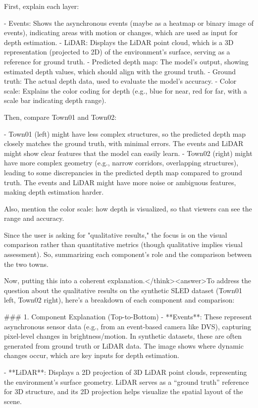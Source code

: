 First, explain each layer:

- Events: Shows the asynchronous events (maybe as a heatmap or binary image of events), indicating areas with motion or changes, which are used as input for depth estimation.
- LiDAR: Displays the LiDAR point cloud, which is a 3D representation (projected to 2D) of the environment's surface, serving as a reference for ground truth.
- Predicted depth map: The model's output, showing estimated depth values, which should align with the ground truth.
- Ground truth: The actual depth data, used to evaluate the model's accuracy.
- Color scale: Explains the color coding for depth (e.g., blue for near, red for far, with a scale bar indicating depth range).

Then, compare Town01 and Town02:

- Town01 (left) might have less complex structures, so the predicted depth map closely matches the ground truth, with minimal errors. The events and LiDAR might show clear features that the model can easily learn.
- Town02 (right) might have more complex geometry (e.g., narrow corridors, overlapping structures), leading to some discrepancies in the predicted depth map compared to ground truth. The events and LiDAR might have more noise or ambiguous features, making depth estimation harder.

Also, mention the color scale: how depth is visualized, so that viewers can see the range and accuracy.

Since the user is asking for "qualitative results," the focus is on the visual comparison rather than quantitative metrics (though qualitative implies visual assessment). So, summarizing each component's role and the comparison between the two towns.

Now, putting this into a coherent explanation.</think><answer>To address the question about the qualitative results on the synthetic SLED dataset (Town01 left, Town02 right), here’s a breakdown of each component and comparison:  


### 1. Component Explanation (Top-to-Bottom)  
- **Events**:  
  These represent asynchronous sensor data (e.g., from an event-based camera like DVS), capturing pixel-level changes in brightness/motion. In synthetic datasets, these are often generated from ground truth or LiDAR data. The image shows where dynamic changes occur, which are key inputs for depth estimation.  

- **LiDAR**:  
  Displays a 2D projection of 3D LiDAR point clouds, representing the environment’s surface geometry. LiDAR serves as a “ground truth” reference for 3D structure, and its 2D projection helps visualize the spatial layout of the scene.  

